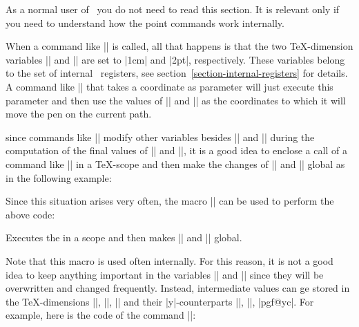 \label{section-internal-pointcmds}

As a normal user of \pgfname\ you do not need to read this section. It
is relevant only if you need to understand how the point commands work
internally.

When a command like |\pgfpoint{1cm}{2pt}| is called, all that happens
is that the two \TeX-dimension variables |\pgf@x| and |\pgf@y| are set
to |1cm| and |2pt|, respectively. These variables belong to the set of
internal \pgfname\ registers, see section~\ref{section-internal-registers}
for details. A command like |\pgfpathmoveto| that
takes a coordinate as parameter will just execute this parameter and
then use the values of |\pgf@x| and |\pgf@y| as the coordinates to
which it will move the pen on the current path.

since commands like |\pgfpointnormalised| modify other variables
besides |\pgf@x| and |\pgf@y| during the computation of the final values of
|\pgf@x| and |\pgf@y|, it is a good idea to enclose a call of a
command like |\pgfpoint| in a \TeX-scope and then make the changes of
|\pgf@x| and |\pgf@y| global as in the following example:

\makeatletter
Since this situation arises very often, the macro |\pgf@process| can
be used to perform the above code:
\begin{command}{\pgf@process{}}
  Executes the  in a scope and then makes |\pgf@x| and
  |\pgf@y| global.
\end{command}

Note that this macro is used often internally. For this reason, it is
not a good idea to keep anything important in the variables |\pgf@x|
and |\pgf@y| since they will be overwritten and changed
frequently. Instead, intermediate values can ge stored in the
\TeX-dimensions |\pgf@xa|, |\pgf@xb|, |\pgf@xc| and their
|y|-counterparts |\pgf@ya|, |\pgf@yb|, |pgf@yc|. For example, here is
the code of the command |\pgfpointadd|:
\begin{codeexample}
\def\pgfpointadd#1#2{%
  \pgf@process{#1}%
  \pgf@xa=\pgf@x%
  \pgf@ya=\pgf@y%
  \pgf@process{#2}%
  \advance\pgf@x by\pgf@xa%
  \advance\pgf@y by\pgf@ya}
\end{codeexample}



